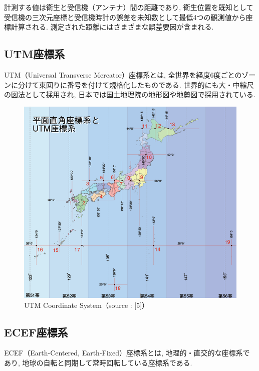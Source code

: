 計測する値は衛生と受信機（アンテナ）間の距離であり, 衛生位置を既知として受信機の三次元座標と受信機時計の誤差を未知数として最低4つの観測値から座標計算される.
測定された距離にはさまざまな誤差要因が含まれる.

\subsection{UTM座標系}
UTM（Universal Transverse Mercator）座標系\cite{utm}とは, 全世界を経度6度ごとのゾーンに分けて東回りに番号を付けて規格化したものである.
世界的にも大・中縮尺の図法として採用され, 日本では国土地理院の地形図や地勢図で採用されている.

\begin{figure}[H]
  \centering
 \includegraphics[keepaspectratio, scale=0.7]
      {images/UTMCoordinateSystem.png}
 \caption{UTM Coordinate System（source : [5]）}
 \label{fig:UTM}
\end{figure}


\subsection{ECEF座標系}
ECEF（Earth-Centered, Earth-Fixed）座標系とは, 地理的・直交的な座標系であり, 地球の自転と同期して常時回転している座標系である.

